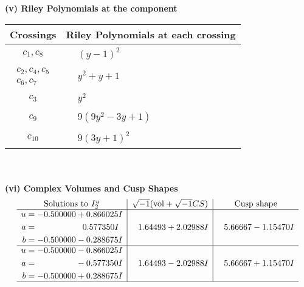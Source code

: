 \documentclass[1p]{elsarticle_modified}
\theoremstyle{definition}
\newcommand{\I}{\sqrt{-1}}
\begin{document}
\flushleft \textbf{(v) Riley Polynomials at the component}\newline \\
\begin{tabular}{m{50pt}|m{274pt}}
Crossings & \hspace{64pt}Riley Polynomials at each crossing \\
\hline $$\begin{aligned}c_{1},c_{8}\end{aligned}$$&$\begin{aligned}
&(y-1)^2
\end{aligned}$\\
\hline $$\begin{aligned}c_{2},c_{4},c_{5}\\c_{6},c_{7}\end{aligned}$$&$\begin{aligned}
&y^2+y+1
\end{aligned}$\\
\hline $$\begin{aligned}c_{3}\end{aligned}$$&$\begin{aligned}
&y^2
\end{aligned}$\\
\hline $$\begin{aligned}c_{9}\end{aligned}$$&$\begin{aligned}
&9(9 y^2-3 y+1)
\end{aligned}$\\
\hline $$\begin{aligned}c_{10}\end{aligned}$$&$\begin{aligned}
&9(3 y+1)^2
\end{aligned}$\\
\hline
\end{tabular}\\~\\
\newpage\flushleft \textbf{(vi) Complex Volumes and Cusp Shapes}
$$\begin{array}{c|c|c}  
\text{Solutions to }I^u_{2}& \I (\text{vol} + \sqrt{-1}CS) & \text{Cusp shape}\\
 \hline 
\begin{aligned}
u &= -0.500000 + 0.866025 I \\
a &= \phantom{-0.000000 -}0.577350 I \\
b &= -0.500000 - 0.288675 I\end{aligned}
 & \phantom{-}1.64493 + 2.02988 I & \phantom{-}5.66667 - 1.15470 I \\ \hline\begin{aligned}
u &= -0.500000 - 0.866025 I \\
a &= \phantom{-0.000000 } -0.577350 I \\
b &= -0.500000 + 0.288675 I\end{aligned}
 & \phantom{-}1.64493 - 2.02988 I & \phantom{-}5.66667 + 1.15470 I\\
 \hline 
 \end{array}$$\newpage
\end{document}
